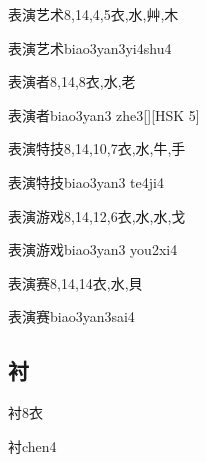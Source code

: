 \begin{Entry}{表演艺术}{8,14,4,5}{⾐,⽔,⾋,⽊}
  \begin{Phonetics}{表演艺术}{biao3yan3yi4shu4}
  \end{Phonetics}
\end{Entry}

\begin{Entry}{表演者}{8,14,8}{⾐,⽔,⽼}
  \begin{Phonetics}{表演者}{biao3yan3 zhe3}[][HSK 5]
  \end{Phonetics}
\end{Entry}

\begin{Entry}{表演特技}{8,14,10,7}{⾐,⽔,⽜,⼿}
  \begin{Phonetics}{表演特技}{biao3yan3 te4ji4}
  \end{Phonetics}
\end{Entry}

\begin{Entry}{表演游戏}{8,14,12,6}{⾐,⽔,⽔,⼽}
  \begin{Phonetics}{表演游戏}{biao3yan3 you2xi4}
  \end{Phonetics}
\end{Entry}

\begin{Entry}{表演赛}{8,14,14}{⾐,⽔,⾙}
  \begin{Phonetics}{表演赛}{biao3yan3sai4}
  \end{Phonetics}
\end{Entry}

\subsection*{衬}

\begin{Entry}{衬}{8}{⾐}
  \begin{Phonetics}{衬}{chen4}
  \end{Phonetics}
\end{Entry}

